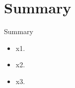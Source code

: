 \section{Summary}\label{ch13:summary}

\begin{center}
	\begin{tkawybox}{Summary}
		\begin{itemize}
			\setlength{\itemsep}{0pt}
			\setlength{\parskip}{0pt}
			\setlength{\parsep}{0pt}
			
			\item x1.
			\item x2.
			\item x3.
		\end{itemize}
	\end{tkawybox}
\end{center}

